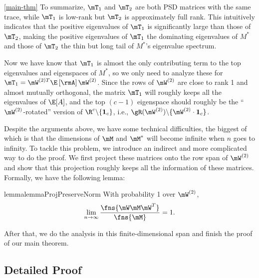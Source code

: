 \begin{proofof}{\cref{main-thm}}
To summarize, $\mT_1$ and $\mT_2$ are both PSD matrices with the same trace, while $\mT_1$ is low-rank but $\mT_2$ is approximately full rank. This intuitively indicates that the positive eigenvalues of $\mT_1$ is significantly large than those of $\mT_2$, making the positive eigenvalues of $\mT_1$ the dominating eigenvalues of $M^*$ and those of $\mT_2$ the thin but long tail of $M^*$'s eigenvalue spectrum.

Now we have know that $\mT_1$ is almost the only contributing term to the top eigenvalues and eigenspaces of $M^*$, so we only need to analyze these for $\mT_1=\mW^{(2)T}\E\left[\rmA\right]\mW^{(2)}$. Since the rows of $\mW^{(2)}$ are close to rank 1 and almost mutually orthogonal, the matrix $\mT_1$ will roughly keeps all the eigenvalues of $\E[A]$, and the top $(c-1)$ eigenspace should roughly be the ``$\mW^{(2)}$-rotated'' version of $\R^c\backslash\{\textbf{1}_c\}$, i.e., $\gR(\mW^{(2)})\backslash\{\mW^{(2)}\cdot\textbf{1}_c\}$.

Despite the arguments above, we have some technical difficulties, the biggest of which is that the dimensions of $\mM$ and $\mM^*$ will become infinite when $n$ goes to infinity. To tackle this problem, we introduce an indirect and more complicated way to do the proof. We first project these matrices onto the row span of $\mW^{(2)}$ and show that this projection roughly keeps all the information of these matrices. Formally, we have the following lemma:
\begin{restatable}{lemma}{lemmaProjPreserveNorm}
\label{corr:proj-preserve-F-norm} With probability 1 over $\mW^{(2)}$,
\[\lim_{n\to\infty}\frac{\fns{\mW\mM\mW^T}}{\fns{\mM}}=1.\]
\end{restatable}
After that, we do the analysis in this finite-dimensional span and finish the proof of our main theorem.

\end{proofof}

\subsection{Detailed Proof}
\label{detailed-proof}

